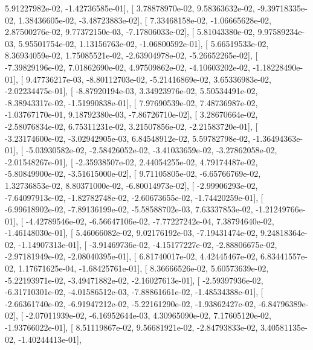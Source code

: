 \documentclass{article}
\begin{document}
          5.91227982e-02,  -1.42736585e-01],
       [  3.78878970e-02,   9.58363632e-02,  -9.39718335e-02,
          1.38436605e-02,  -3.48723883e-02],
       [  7.33468158e-02,  -1.06665628e-02,   2.87500276e-02,
          9.77372150e-03,  -7.17806033e-02],
       [  5.81043380e-02,   9.97589234e-03,   5.95501754e-02,
          1.13156763e-02,  -1.06800592e-01],
       [  5.66519533e-02,   8.36934059e-02,   1.75085521e-02,
         -2.63904978e-02,  -5.26652265e-02],
       [ -7.39829196e-02,   7.01862690e-02,   4.97509862e-02,
         -4.10603202e-02,  -1.18228490e-01],
       [  9.47736217e-03,  -8.80112703e-02,  -5.21416869e-02,
          3.65336983e-02,  -2.02234475e-01],
       [ -8.87920194e-03,   3.34923976e-02,   5.50534491e-02,
         -8.38943317e-02,  -1.51990838e-01],
       [  7.97690539e-02,   7.48736987e-02,  -1.03767170e-01,
          9.18792380e-03,  -7.86726710e-02],
       [  3.28670664e-02,  -2.58076834e-02,   6.75311231e-02,
          3.21507856e-02,  -2.21583720e-01],
       [ -3.23174600e-02,  -3.02942905e-03,   6.84548912e-02,
          5.59782798e-02,  -1.36494363e-01],
       [ -5.03930582e-02,  -2.58426052e-02,  -3.41033659e-02,
         -3.27862058e-02,  -2.01548267e-01],
       [ -2.35938507e-02,   2.44054255e-02,   4.79174487e-02,
         -5.80849900e-02,  -3.51615000e-02],
       [  9.71105805e-02,  -6.65766769e-02,   1.32736853e-02,
          8.80371000e-02,  -6.80014973e-02],
       [ -2.99906293e-02,  -7.64097913e-02,  -1.82782748e-02,
         -2.60673655e-02,  -1.74420259e-01],
       [ -6.99618902e-02,  -7.89136199e-02,  -5.58588702e-03,
          7.63337853e-02,  -1.21249766e-01],
       [ -4.42789546e-02,  -6.56647106e-02,  -7.77227242e-04,
          7.38794640e-02,  -1.46148030e-01],
       [  5.46066082e-02,   9.02176192e-03,  -7.19431474e-02,
          9.24818364e-02,  -1.14907313e-01],
       [ -3.91469736e-02,  -4.15177227e-02,  -2.88806675e-02,
         -2.97181949e-02,  -2.08040395e-01],
       [  6.81740017e-02,   4.42445467e-02,   6.83441557e-02,
          1.17671625e-04,  -1.68425761e-01],
       [  8.36666526e-02,   5.60573639e-02,  -5.22193971e-02,
         -3.49471882e-02,  -2.16027613e-01],
       [ -2.59397936e-02,  -6.31710301e-02,  -4.01586512e-03,
         -7.88861661e-02,  -1.48534388e-01],
       [ -2.66361740e-02,  -6.91947212e-02,  -5.22161290e-02,
         -1.93862427e-02,  -6.84796389e-02],
       [ -2.07011939e-02,  -6.16952644e-03,   4.30965090e-02,
          7.17605120e-02,  -1.93766022e-01],
       [  8.51119867e-02,   9.56681921e-02,  -2.84793833e-02,
          3.40581135e-02,  -1.40244413e-01],
\end{document}
